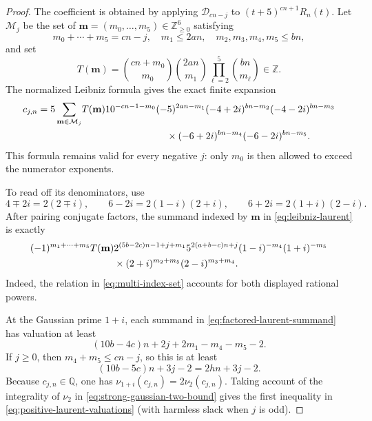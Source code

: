 \documentclass[11pt,reqno,letterpaper]{amsart}
\numberwithin{equation}{section}
\theoremstyle{definition}
\theoremstyle{remark}
\begin{document}
\begin{proof}
The coefficient is obtained by applying $\mathcal D_{cn-j}$ to
$(t+5)^{cn+1}R_n(t)$.  Let $\mathcal M_j$ be the set of
$\mathbf m=(m_0,\ldots,m_5)\in\mathbb Z_{\geq0}^6$ satisfying
\begin{equation}\label{eq:multi-index-set}
 m_0+\cdots+m_5=cn-j,
 \quad m_1\leq2an,
 \quad m_2,m_3,m_4,m_5\leq bn,
\end{equation}
and set
\[
 T(\mathbf m)=\binom{cn+m_0}{m_0}\binom{2an}{m_1}
 \prod_{\ell=2}^5\binom{bn}{m_\ell}\in\mathbb Z.
\]
The normalized Leibniz formula gives the exact finite expansion
\begin{align}
 c_{j,n}=5\sum_{\mathbf m\in\mathcal M_j}&T(\mathbf m)
 10^{-cn-1-m_0}(-5)^{2an-m_1}
 (-4+2i)^{bn-m_2}(-4-2i)^{bn-m_3}\notag\\
 &\hspace{31mm}{}
 \times(-6+2i)^{bn-m_4}(-6-2i)^{bn-m_5}.
 \label{eq:leibniz-laurent}
\end{align}
This formula remains valid for every negative $j$: only $m_0$ is then
allowed to exceed the numerator exponents.

To read off its denominators, use
\[
 4\mp2i=2(2\mp i),
 \qquad 6-2i=2(1-i)(2+i),
 \qquad 6+2i=2(1+i)(2-i).
\]
After pairing conjugate factors, the summand indexed by $\mathbf m$ in
\eqref{eq:leibniz-laurent} is exactly
\begin{align}
 (-1)^{m_1+\cdots+m_5}T(\mathbf m)&
 2^{(5b-2c)n-1+j+m_1}
 5^{2(a+b-c)n+j}
 (1-i)^{-m_4}(1+i)^{-m_5}\notag\\
 &{}\times(2+i)^{m_2+m_5}(2-i)^{m_3+m_4}.
 \label{eq:factored-laurent-summand}
\end{align}
Indeed, the relation in \eqref{eq:multi-index-set} accounts for both
displayed rational powers.

At the Gaussian prime $1+i$, each summand in
\eqref{eq:factored-laurent-summand} has valuation at least
\begin{equation}\label{eq:gaussian-two-bound}
 (10b-4c)n+2j+2m_1-m_4-m_5-2.
\end{equation}
If $j\geq0$, then $m_4+m_5\leq cn-j$, so this is at least
\begin{equation}\label{eq:strong-gaussian-two-bound}
 (10b-5c)n+3j-2=2hn+3j-2.
\end{equation}
Because $c_{j,n}\in\mathbb Q$, one has
$\nu_{1+i}(c_{j,n})=2\nu_2(c_{j,n})$.  Taking account of the integrality
of $\nu_2$ in \eqref{eq:strong-gaussian-two-bound} gives the first
inequality in \eqref{eq:positive-laurent-valuations} (with harmless slack
when $j$ is odd).


\end{proof}
\end{document}
